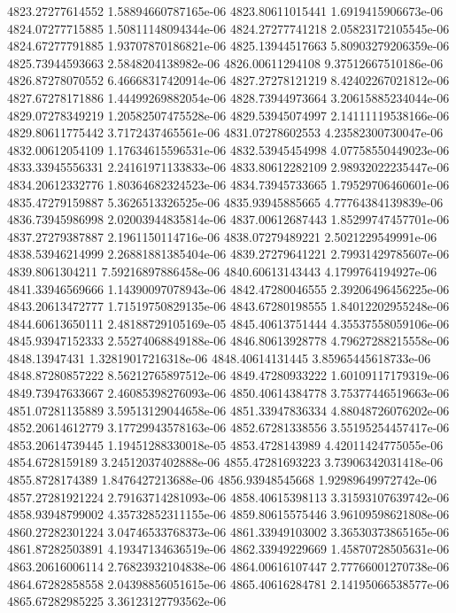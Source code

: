 {4823.27277614552 1.58894660787165e-06
4823.80611015441 1.6919415906673e-06
4824.07277715885 1.50811148094344e-06
4824.27277741218 2.05823172105545e-06
4824.67277791885 1.93707870186821e-06
4825.13944517663 5.80903279206359e-06
4825.73944593663 2.5848204138982e-06
4826.00611294108 9.37512667510186e-06
4826.87278070552 6.46668317420914e-06
4827.27278121219 8.42402267021812e-06
4827.67278171886 1.44499269882054e-06
4828.73944973664 3.20615885234044e-06
4829.07278349219 1.20582507475528e-06
4829.53945074997 2.14111119538166e-06
4829.80611775442 3.7172437465561e-06
4831.07278602553 4.23582300730047e-06
4832.00612054109 1.17634615596531e-06
4832.53945454998 4.07758550449023e-06
4833.33945556331 2.24161971133833e-06
4833.80612282109 2.98932022235447e-06
4834.20612332776 1.80364682324523e-06
4834.73945733665 1.79529706460601e-06
4835.47279159887 5.3626513326525e-06
4835.93945885665 4.77764384139839e-06
4836.73945986998 2.02003944835814e-06
4837.00612687443 1.85299747457701e-06
4837.27279387887 2.1961150114716e-06
4838.07279489221 2.5021229549991e-06
4838.53946214999 2.26881881385404e-06
4839.27279641221 2.79931429785607e-06
4839.8061304211 7.59216897886458e-06
4840.60613143443 4.1799764194927e-06
4841.33946569666 1.14390097078943e-06
4842.47280046555 2.39206496456225e-06
4843.20613472777 1.71519750829135e-06
4843.67280198555 1.84012202955248e-06
4844.60613650111 2.48188729105169e-05
4845.40613751444 4.35537558059106e-06
4845.93947152333 2.55274068849188e-06
4846.80613928778 4.79627288215558e-06
4848.13947431 1.32819017216318e-06
4848.40614131445 3.85965445618733e-06
4848.87280857222 8.56212765897512e-06
4849.47280933222 1.60109117179319e-06
4849.73947633667 2.46085398276093e-06
4850.40614384778 3.75377446519663e-06
4851.07281135889 3.59513129044658e-06
4851.33947836334 4.88048726076202e-06
4852.20614612779 3.17729943578163e-06
4852.67281338556 3.55195254457417e-06
4853.20614739445 1.19451288330018e-05
4853.4728143989 4.42011424775055e-06
4854.6728159189 3.24512037402888e-06
4855.47281693223 3.73906342031418e-06
4855.8728174389 1.8476427213688e-06
4856.93948545668 1.92989649972742e-06
4857.27281921224 2.79163714281093e-06
4858.40615398113 3.31593107639742e-06
4858.93948799002 4.35732852311155e-06
4859.80615575446 3.96109598621808e-06
4860.27282301224 3.04746533768373e-06
4861.33949103002 3.36530373865165e-06
4861.87282503891 4.19347134636519e-06
4862.33949229669 1.45870728505631e-06
4863.20616006114 2.76823932104838e-06
4864.00616107447 2.77766001270738e-06
4864.67282858558 2.04398856051615e-06
4865.40616284781 2.14195066538577e-06
4865.67282985225 3.36123127793562e-06
}
